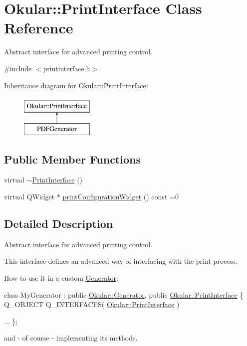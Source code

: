 \hypertarget{classOkular_1_1PrintInterface}{\section{Okular\+:\+:Print\+Interface Class Reference}
\label{classOkular_1_1PrintInterface}
}


Abstract interface for advanced printing control.  




{\ttfamily \#include $<$printinterface.\+h$>$}

Inheritance diagram for Okular\+:\+:Print\+Interface\+:\begin{figure}[H]
\begin{center}
\leavevmode
\includegraphics[height=2.000000cm]{classOkular_1_1PrintInterface}
\end{center}
\end{figure}
\subsection*{Public Member Functions}
\begin{DoxyCompactItemize}
\item 
virtual \hyperlink{classOkular_1_1PrintInterface_a0a3788c63857f1132af81229d72f6d28}{$\sim$\+Print\+Interface} ()
\item 
virtual Q\+Widget $\ast$ \hyperlink{classOkular_1_1PrintInterface_abb520895dfde25d3c0befac5c0f77b80}{print\+Configuration\+Widget} () const =0
\end{DoxyCompactItemize}


\subsection{Detailed Description}
Abstract interface for advanced printing control. 

This interface defines an advanced way of interfacing with the print process.

How to use it in a custom \hyperlink{classOkular_1_1Generator}{Generator}\+: 
\begin{DoxyCode}
\textcolor{keyword}{class }MyGenerator : \textcolor{keyword}{public} \hyperlink{classOkular_1_1Generator}{Okular::Generator}, \textcolor{keyword}{public} 
      \hyperlink{classOkular_1_1PrintInterface}{Okular::PrintInterface}
\{
    Q\_OBJECT
    Q\_INTERFACES( \hyperlink{classOkular_1_1PrintInterface}{Okular::PrintInterface} )

    ...
\};
\end{DoxyCode}
 and -\/ of course -\/ implementing its methods. 

